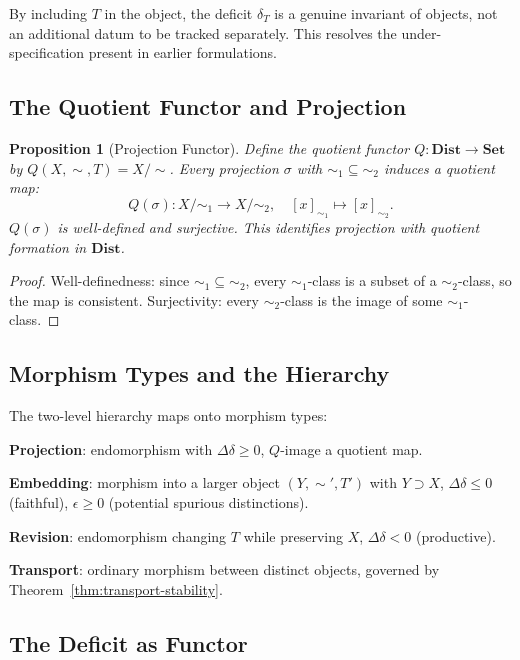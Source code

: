 \documentclass[12pt, a4paper]{article}
\theoremstyle{plain}
\newtheorem{proposition}[theorem]{Proposition}
\theoremstyle{definition}
\theoremstyle{remark}
\newcommand{\Ddelta}{\Delta\delta}
\newcommand{\eps}{\epsilon}
\begin{document}
By including $T$ in the object, the deficit $\delta_T$ is a genuine invariant
of objects, not an additional datum to be tracked separately. This resolves
the under-specification present in earlier formulations.

\subsection{The Quotient Functor and Projection}

\begin{proposition}[Projection Functor]
\label{prop:proj-functor}
Define the quotient functor $Q:\mathbf{Dist}\to\mathbf{Set}$ by
$Q(X,\sim,T)=X/{\sim}$. Every projection $\sigma$ with
$\sim_1\subseteq\sim_2$ induces a quotient map:
\[
  Q(\sigma):X/{\sim_1}\to X/{\sim_2},\quad[x]_{\sim_1}\mapsto[x]_{\sim_2}.
\]
$Q(\sigma)$ is well-defined and surjective. This identifies projection with
quotient formation in $\mathbf{Dist}$.
\end{proposition}

\begin{proof}
Well-definedness: since $\sim_1\subseteq\sim_2$, every $\sim_1$-class is
a subset of a $\sim_2$-class, so the map is consistent. Surjectivity: every
$\sim_2$-class is the image of some $\sim_1$-class.
\end{proof}

\subsection{Morphism Types and the Hierarchy}

The two-level hierarchy maps onto morphism types:

\medskip\noindent\textbf{Projection}: endomorphism with $\Ddelta\ge 0$,
$Q$-image a quotient map.

\medskip\noindent\textbf{Embedding}: morphism into a larger object
$(Y,\sim',T')$ with $Y\supset X$, $\Ddelta\le 0$ (faithful), $\eps\ge 0$
(potential spurious distinctions).

\medskip\noindent\textbf{Revision}: endomorphism changing $T$ while preserving
$X$, $\Ddelta<0$ (productive).

\medskip\noindent\textbf{Transport}: ordinary morphism between distinct objects,
governed by Theorem~\ref{thm:transport-stability}.

\subsection{The Deficit as Functor}
\end{document}
